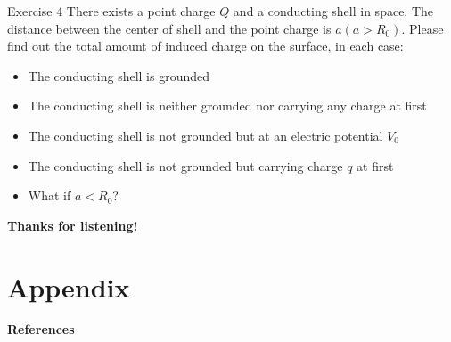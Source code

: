 \documentclass{beamer}
\begin{document}
\begin{frame}{Exercise 4}
    There exists a point charge $Q$ and a conducting shell in space. The distance between the center of shell 
    and the point charge is $a(a>R_0)$. Please find out the total amount of induced charge on the surface, in each case:
    \begin{itemize}
        \item The conducting shell is grounded
        \item The conducting shell is neither grounded nor carrying any charge at first
        \item The conducting shell is not grounded but at an electric potential $V_0$
        \item The conducting shell is not grounded but carrying charge $q$ at first
        \item What if $a<R_0$?
    \end{itemize}
\end{frame}


\begin{frame}
    \begin{center}
        \LARGE\bf Thanks for listening!
    \end{center}
	
\end{frame}


\section{Appendix}


\begin{frame}{\bf References}
	\nocite{*} %
	
	
\end{frame}
\end{document}
